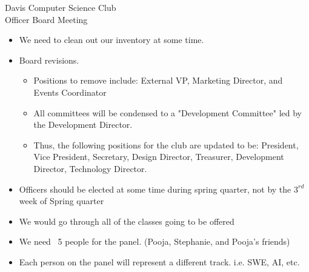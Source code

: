 \documentclass{article}
\begin{document}
\begin{Minutes}{Davis Computer Science Club\\Officer Board Meeting}

\missingExcused{%
}





\maketitle

\begin{itemize}
    \item We need to clean out our inventory at some time. 
\end{itemize}

\begin{itemize}
    \item Board revisions.
    \begin{itemize}
    		\item Positions to remove include: External VP, Marketing Director, and Events Coordinator
    		\item All committees will be condensed to a "Development Committee" led by the Development Director.
    		\item Thus, the following positions for the club are updated to be: President, Vice President, Secretary, Design Director, Treasurer, Development Director, Technology Director.
    \end{itemize}
   	\item Officers should be elected at some time  during spring quarter, not by the $3^{rd}$ week of Spring quarter
\end{itemize}

\begin{itemize}
    \item We would go through all of the classes going to be offered
    \item We need ~5 people for the panel. (Pooja, Stephanie, and Pooja's friends)
    \item Each person on the panel will represent a different track. i.e. SWE, AI, etc.   	
\end{itemize}


\end{Minutes}
\end{document}
